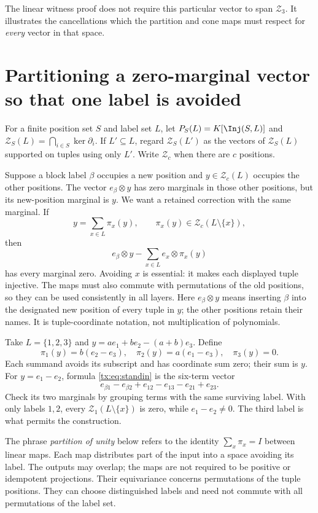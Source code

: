 The linear witness proof does not require this particular vector to
span $\mathcal Z_3$. It illustrates the cancellations which the
partition and cone maps must respect for \emph{every} vector in
that space.

\section{Partitioning a zero-marginal vector so that one label is avoided}\label{tx:sec:partition}
For a finite position set $S$ and label set $L$, let $P_S(L)=K[\Inj(S,L)]$ and $\mathcal Z_S(L)=\bigcap_{i\in S}\ker\partial_i$. If $L'\subseteq L$, regard $\mathcal Z_S(L')$ as the vectors of $\mathcal Z_S(L)$ supported on tuples using only $L'$. Write $\mathcal Z_c$ when there are $c$ positions.

Suppose a block label $\beta$ occupies a new position and $y\in \mathcal Z_c(L)$ occupies the other positions. The vector $e_\beta\otimes y$ has zero marginals in those other positions, but its new-position marginal is $y$. We want a retained correction with the same marginal. If
\[y=\sum_{x\in L}\pi_x(y),\qquad \pi_x(y)\in \mathcal Z_c(L\setminus\{x\}),
\]
then
\begin{equation}\label{tx:eq:standin}
e_\beta\otimes y-\sum_{x\in L}e_x\otimes\pi_x(y)
\end{equation}
has every marginal zero. Avoiding $x$ is essential: it makes each displayed tuple injective. The maps must also commute with permutations of the old positions, so they can be used consistently in all layers.
Here $e_\beta\otimes y$ means inserting $\beta$ into the designated
new position of every tuple in $y$; the other positions retain their
names. It is tuple-coordinate notation, not multiplication of
polynomials.

\begin{example}
Take $L=\{1,2,3\}$ and $y=a e_1+b e_2-(a+b)e_3$. Define
\[\pi_1(y)=b(e_2-e_3),\quad \pi_2(y)=a(e_1-e_3),\quad\pi_3(y)=0.
\]
Each summand avoids its subscript and has coordinate sum zero; their sum is $y$. For $y=e_1-e_2$, formula \eqref{tx:eq:standin} is the six-term vector
\[e_{\beta1}-e_{\beta2}+e_{12}-e_{13}-e_{21}+e_{23}.
\]
Check its two marginals by grouping terms with the same surviving label. With only labels $1,2$, every $\mathcal Z_1(L\setminus\{x\})$ is zero, while $e_1-e_2\ne0$. The third label is what permits the construction.
\end{example}

The phrase \emph{partition of unity} below refers to the identity
$\sum_x\pi_x=I$ between linear maps. Each map distributes part of
the input into a space avoiding its label. The outputs may overlap;
the maps are not required to be positive or idempotent projections.
Their equivariance concerns permutations of the tuple positions.
They can choose distinguished labels and need not commute with all
permutations of the label set.

